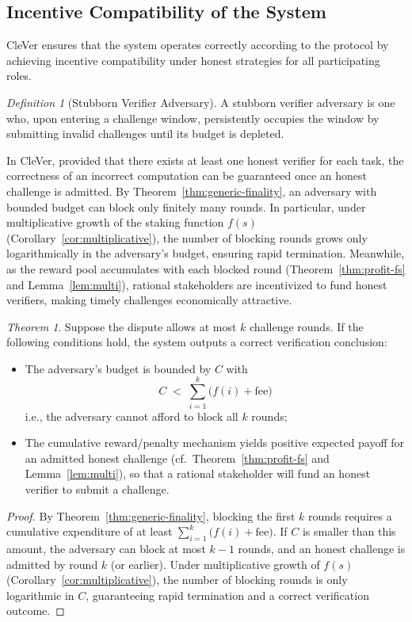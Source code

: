 \documentclass[3p]{elsarticle}
\theoremstyle{remark}
\newtheorem{theorem}{Theorem}
\newtheorem{definition}{Definition}
\begin{document}
\subsection{Incentive Compatibility of the System}

CleVer ensures that the system operates correctly according to the protocol by achieving incentive compatibility under honest strategies for all participating roles.

\begin{definition}[Stubborn Verifier Adversary]
A stubborn verifier adversary is one who, upon entering a challenge window, persistently occupies the window by submitting invalid challenges until its budget is depleted.
\end{definition}

In CleVer, provided that there exists at least one honest verifier for each task, the correctness of an incorrect computation can be guaranteed once an honest challenge is admitted. By Theorem~\ref{thm:generic-finality}, an adversary with bounded budget can block only finitely many rounds. In particular, under multiplicative growth of the staking function $f(s)$ (Corollary~\ref{cor:multiplicative}), the number of blocking rounds grows only logarithmically in the adversary’s budget, ensuring rapid termination. Meanwhile, as the reward pool accumulates with each blocked round (Theorem~\ref{thm:profit-fs} and Lemma~\ref{lem:multi}), rational stakeholders are incentivized to fund honest verifiers, making timely challenges economically attractive.

\begin{theorem}
Suppose the dispute allows at most $k$ challenge rounds. If the following conditions hold, the system outputs a correct verification conclusion:
\begin{itemize}
    \item The adversary’s budget is bounded by $C$ with
    \[
    C \;<\; \sum_{i=1}^{k}\big(f(i)+\mathrm{fee}\big)
    \]
    i.e., the adversary cannot afford to block all $k$ rounds;
    \item The cumulative reward/penalty mechanism yields positive expected payoff for an admitted honest challenge (cf.\ Theorem~\ref{thm:profit-fs} and Lemma~\ref{lem:multi}), so that a rational stakeholder will fund an honest verifier to submit a challenge.
\end{itemize}
\end{theorem}

\begin{proof}
By Theorem~\ref{thm:generic-finality}, blocking the first $k$ rounds requires a cumulative expenditure of at least $\sum_{i=1}^{k}\big(f(i)+\mathrm{fee}\big)$. If $C$ is smaller than this amount, the adversary can block at most $k-1$ rounds, and an honest challenge is admitted by round $k$ (or earlier). Under multiplicative growth of $f(s)$ (Corollary~\ref{cor:multiplicative}), the number of blocking rounds is only logarithmic in $C$, guaranteeing rapid termination and a correct verification outcome.
\end{proof}
\end{document}
